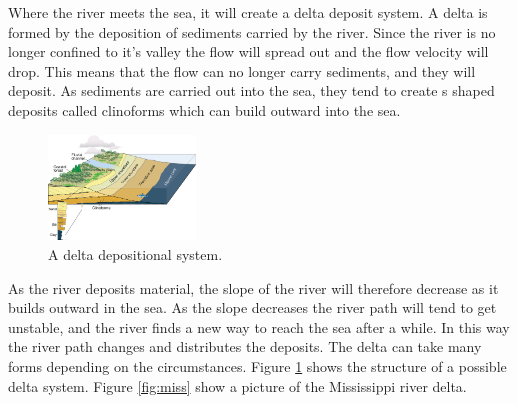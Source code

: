 \documentclass[a4paper,12pt]{report}
\begin{document}
Where the river meets the sea, it will create a delta deposit system. A delta is formed by the deposition of sediments carried by the river. Since the river is no longer confined to it's valley the flow will spread out and the flow velocity will drop. This means that the flow can no longer carry sediments, and they will deposit. As sediments are carried out into the sea, they tend to create s shaped deposits called clinoforms which can build outward into the sea.
\begin{figure}
 \centering

    \includegraphics[width=0.35\textwidth]{thesis/geo/english/Delta3D.jpg}
  
  \caption{A delta depositional system. }
  \label{fig:delta}
\end{figure}
As the river deposits material, the slope of the river will therefore decrease as it builds outward in the sea. As the slope decreases the river path will tend to get unstable, and the river finds a new way to reach the sea after a while. In this way the river path changes and distributes the deposits. The delta can take many forms depending on the circumstances. Figure \ref{fig:delta} shows the structure of a possible delta system. Figure \ref{fig:miss} show a picture of the Mississippi river delta.
\end{document}
